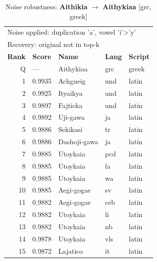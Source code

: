 \begin{table}[htbp]
\centering
\small
\caption{Noise robustness: \textbf{Aithikia} $\rightarrow$ \textbf{Aithykiaa} [grc, greek]}
\label{tab:noise-26}
\begin{tabular}{rllll}
\toprule
\multicolumn{5}{l}{\small Noise applied: duplication 'a', vowel 'i'>'y'} \\
\multicolumn{5}{l}{\small Recovery: original not in top-k} \\
\midrule
\textbf{Rank} & \textbf{Score} & \textbf{Name} & \textbf{Lang} & \textbf{Script} \\
\midrule
\rowcolor{gray!20} Q & --- & Aithykiaa & grc & greek \\
\midrule
1 & 0.9935 & Achgueig & und & latin \\
2 & 0.9925 & Ityaikya & und & latin \\
3 & 0.9897 & Fajticka & und & latin \\
4 & 0.9892 & Uji-gawa & ja & latin \\
5 & 0.9886 & Sekikasi & tr & latin \\
6 & 0.9886 & Dashoji-gawa & ja & latin \\
7 & 0.9885 & Utoykaia & pcd & latin \\
8 & 0.9885 & Utoykaia & la & latin \\
9 & 0.9885 & Utoykaia & wa & latin \\
10 & 0.9885 & Aegi-gogae & sv & latin \\
11 & 0.9882 & Aegi-gogae & ceb & latin \\
12 & 0.9882 & Utoykaia & li & latin \\
13 & 0.9882 & Utoykaia & nb & latin \\
14 & 0.9878 & Utoykaia & vls & latin \\
15 & 0.9872 & Lajatico & it & latin \\
\bottomrule
\end{tabular}
\end{table}

